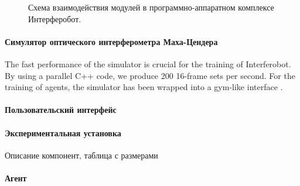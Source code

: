 \begin{figure}[ht]
\caption{Схема взаимодействия модулей в программно-аппаратном комплексе Интерферобот.}
\label{fig:interf_complex}
\end{figure}

\paragraph{Симулятор оптического интерферометра Маха-Цендера}
The fast performance of the simulator is crucial for the training of Interferobot. By using a parallel C++ code, we produce 200 16-frame sets per second. For the training of agents, the simulator has been wrapped into a gym-like interface \cite{brockman2016openai}. 

\paragraph{Пользовательский интерфейс}


\paragraph{Экспериментальная установка}

Описание компонент, таблица с размерами



\paragraph{Агент}


